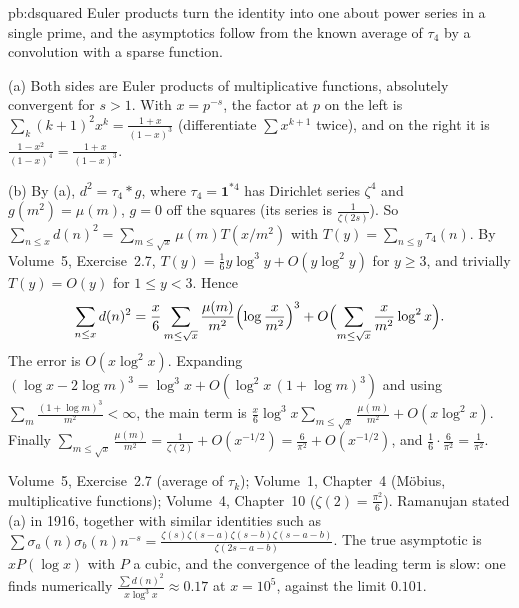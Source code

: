 \begin{solution}{pb:dsquared}
\idea Euler products turn the identity into one about power series in a single prime, and the asymptotics follow from the known
average of $\tau_4$ by a convolution with a sparse function.

\writeup (a) Both sides are Euler products of multiplicative functions, absolutely convergent for $s>1$. With $x=p^{-s}$, the
factor at $p$ on the left is $\sum_k(k+1)^2x^k=\frac{1+x}{(1-x)^3}$ (differentiate $\sum x^{k+1}$ twice), and on the right it is
$\frac{1-x^2}{(1-x)^4}=\frac{1+x}{(1-x)^3}$.

(b) By (a), $d^2=\tau_4*g$, where $\tau_4=\mathbf1^{*4}$ has Dirichlet series $\zeta^4$ and $g(m^2)=\mu(m)$, $g=0$ off the squares (its
series is $\frac1{\zeta(2s)}$). So $\sum_{n\le x}d(n)^2=\sum_{m\le\sqrt x}\mu(m)T(x/m^2)$ with $T(y)=\sum_{n\le y}\tau_4(n)$. By Volume~5,
Exercise~2.7, $T(y)=\frac16y\log^3y+O(y\log^2y)$ for $y\ge3$, and trivially $T(y)=O(y)$ for $1\le y<3$. Hence
\[
\sum_{n\le x}d(n)^2=\frac x6\sum_{m\le\sqrt x}\frac{\mu(m)}{m^2}\Bigl(\log\frac x{m^2}\Bigr)^3+O\Bigl(\sum_{m\le\sqrt x}\frac x{m^2}\log^2x\Bigr).
\]
The error is $O(x\log^2x)$. Expanding $(\log x-2\log m)^3=\log^3x+O(\log^2x\,(1+\log m)^3)$ and using $\sum_m\frac{(1+\log m)^3}{m^2}<\infty$,
the main term is $\frac x6\log^3x\sum_{m\le\sqrt x}\frac{\mu(m)}{m^2}+O(x\log^2x)$. Finally
$\sum_{m\le\sqrt x}\frac{\mu(m)}{m^2}=\frac1{\zeta(2)}+O(x^{-1/2})=\frac6{\pi^2}+O(x^{-1/2})$, and $\frac16\cdot\frac6{\pi^2}=\frac1{\pi^2}$.

\tools Volume~5, Exercise~2.7 (average of $\tau_k$); Volume~1, Chapter~4 (Möbius, multiplicative functions); Volume~4, Chapter~10
($\zeta(2)=\frac{\pi^2}6$).
\leads Ramanujan stated (a) in 1916, together with similar identities such as $\sum\sigma_a(n)\sigma_b(n)n^{-s}=\frac{\zeta(s)\zeta(s-a)\zeta(s-b)\zeta(s-a-b)}{\zeta(2s-a-b)}$.
The true asymptotic is $xP(\log x)$ with $P$ a cubic, and the convergence of the leading term is slow: one finds numerically
$\frac{\sum d(n)^2}{x\log^3x}\approx0.17$ at $x=10^5$, against the limit $0.101$.
\end{solution}

